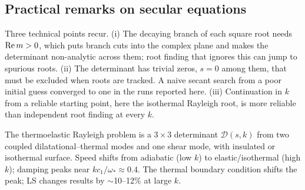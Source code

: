 \subsection{Practical remarks on secular equations}
Three technical points recur. (i) The decaying branch of each square root needs $\operatorname{Re} m>0$, which puts branch cuts into the complex plane and makes the determinant non-analytic across them; root finding that ignores this can jump to spurious roots. (ii) The determinant has trivial zeros, $s=0$ among them, that must be excluded when roots are tracked. A naive secant search from a poor initial guess converged to one in the runs reported here. (iii) Continuation in $k$ from a reliable starting point, here the isothermal Rayleigh root, is more reliable than independent root finding at every $k$.

\begin{summarybox}[Summary]
The thermoelastic Rayleigh problem is a $3\times3$ determinant $\mathcal D(s,k)$ from two coupled dilatational--thermal modes and one shear mode, with insulated or isothermal surface. Speed shifts from adiabatic (low $k$) to elastic/isothermal (high $k$); damping peaks near $k c_1/\omega_*\approx0.4$. The thermal boundary condition shifts the peak; LS changes results by $\sim$10--12\% at large $k$.
\end{summarybox}
